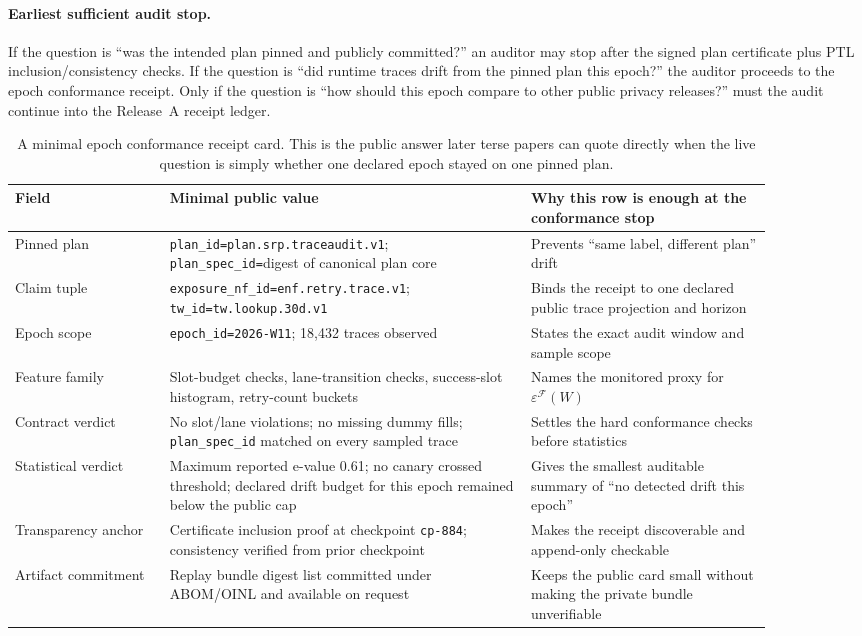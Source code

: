 \documentclass[11pt]{article}
\begin{document}
\paragraph{Earliest sufficient audit stop.}
If the question is ``was the intended plan pinned and publicly committed?'' an auditor may stop after the signed plan certificate plus PTL inclusion/consistency checks.
If the question is ``did runtime traces drift from the pinned plan this epoch?'' the auditor proceeds to the epoch conformance receipt.
Only if the question is ``how should this epoch compare to other public privacy releases?'' must the audit continue into the Release~A receipt ledger.

\begin{table}[t]
\centering\small
\begin{tabular}{@{}p{0.18\linewidth}p{0.42\linewidth}p{0.28\linewidth}@{}}
\toprule
Field & Minimal public value & Why this row is enough at the conformance stop \\
\midrule
Pinned plan & \texttt{plan\_id=plan.srp.traceaudit.v1}; \texttt{plan\_spec\_id=}digest of canonical plan core & Prevents ``same label, different plan'' drift \\
Claim tuple & \texttt{exposure\_nf\_id=enf.retry.trace.v1}; \texttt{tw\_id=tw.lookup.30d.v1} & Binds the receipt to one declared public trace projection and horizon \\
Epoch scope & \texttt{epoch\_id=2026-W11}; 18{,}432 traces observed & States the exact audit window and sample scope \\
Feature family & Slot-budget checks, lane-transition checks, success-slot histogram, retry-count buckets & Names the monitored proxy for \(\varepsilon^{\mathcal F}(W)\) \\
Contract verdict & No slot/lane violations; no missing dummy fills; \texttt{plan\_spec\_id} matched on every sampled trace & Settles the hard conformance checks before statistics \\
Statistical verdict & Maximum reported e-value 0.61; no canary crossed threshold; declared drift budget for this epoch remained below the public cap & Gives the smallest auditable summary of ``no detected drift this epoch'' \\
Transparency anchor & Certificate inclusion proof at checkpoint \texttt{cp-884}; consistency verified from prior checkpoint & Makes the receipt discoverable and append-only checkable \\
Artifact commitment & Replay bundle digest list committed under ABOM/OINL and available on request & Keeps the public card small without making the private bundle unverifiable \\
\bottomrule
\end{tabular}
\caption{A minimal epoch conformance receipt card. This is the public answer later terse papers can quote directly when the live question is simply whether one declared epoch stayed on one pinned plan.}
\label{tab:minimal-epoch-card}
\end{table}
\end{document}
